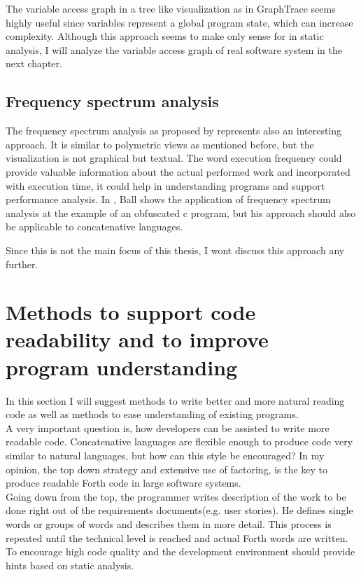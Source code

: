 The variable access graph in a tree like visualization as in GraphTrace seems highly useful since variables represent a global program state, which can increase complexity. Although this approach seems to make only sense for in static analysis, I will analyze the variable access graph of real software system in the next chapter.

\subsection*{Frequency spectrum analysis}

The frequency spectrum analysis as proposed by \cite{Ball:1999:CDA:318774.318944} represents also an interesting approach. It is similar to polymetric views as mentioned before, but the visualization is not graphical but textual. The word execution frequency could provide valuable information about the actual performed work and incorporated with execution time, it could help in understanding programs and support performance analysis. In \cite{Ball:1999:CDA:318774.318944}, Ball shows the application of frequency spectrum analysis at the example of an obfuscated c program, but his approach should also be applicable to concatenative languages.

Since this is not the main focus of this thesis, I wont discuss this approach any further.

\section{Methods to support code readability and to improve program understanding}

In this section I will suggest methods to write better and more natural reading code as well as methods to ease understanding of existing programs.
\\
A very important question is, how developers can be assisted to write more readable code. Concatenative languages are flexible enough to produce code very similar to natural languages, but how can this style be encouraged? In my opinion, the top down strategy and extensive use of factoring, is the key to produce readable Forth code in large software systems.
\\
Going down from the top, the programmer writes description of the work to be done right out of the requirements documents(e.g. user stories). He defines single words or groups of words and describes them in more detail. This process is repeated until the technical level is reached and actual Forth words are written.
\\
To encourage high code quality and the development environment should provide hints based on static analysis.

